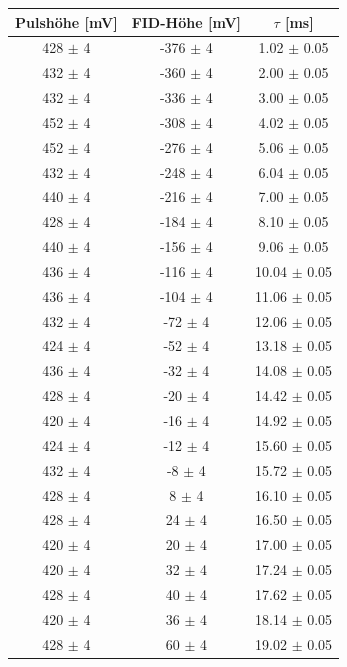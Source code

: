 \documentclass[12pt,a4paper]{article}
\begin{document}
\begin{table}
\centering
\begin{tabular}{|c|c|c|}
\hline 
Pulshöhe [mV] & FID-Höhe [mV] & $\tau$ [ms] \\ 
\hline 
428 $\pm$ 4 & -376 $\pm$ 4 & 1.02 $\pm$ 0.05 \\ 
\hline
432 $\pm$ 4 & -360 $\pm$ 4 & 2.00 $\pm$ 0.05 \\ 
\hline 
432 $\pm$ 4 & -336 $\pm$ 4 & 3.00 $\pm$ 0.05 \\ 
\hline 
452 $\pm$ 4 & -308 $\pm$ 4 & 4.02 $\pm$ 0.05 \\ 
\hline 
452 $\pm$ 4 & -276 $\pm$ 4 & 5.06 $\pm$ 0.05 \\ 
\hline
432 $\pm$ 4 & -248 $\pm$ 4 & 6.04 $\pm$ 0.05 \\ 
\hline 
440 $\pm$ 4 & -216 $\pm$ 4 & 7.00 $\pm$ 0.05 \\ 
\hline 
428 $\pm$ 4 & -184 $\pm$ 4 & 8.10 $\pm$ 0.05 \\ 
\hline 
440 $\pm$ 4 & -156 $\pm$ 4 & 9.06 $\pm$ 0.05 \\ 
\hline 
436 $\pm$ 4 & -116 $\pm$ 4 & 10.04 $\pm$ 0.05 \\ 
\hline
436 $\pm$ 4 & -104 $\pm$ 4 & 11.06 $\pm$ 0.05 \\ 
\hline 
432 $\pm$ 4 & -72 $\pm$ 4 & 12.06 $\pm$ 0.05 \\ 
\hline 
424 $\pm$ 4 & -52 $\pm$ 4 & 13.18 $\pm$ 0.05 \\ 
\hline 
436 $\pm$ 4 & -32 $\pm$ 4 & 14.08 $\pm$ 0.05 \\ 
\hline
428 $\pm$ 4 & -20 $\pm$ 4 & 14.42 $\pm$ 0.05 \\ 
\hline 
420 $\pm$ 4 & -16 $\pm$ 4 & 14.92 $\pm$ 0.05 \\ 
\hline 
424 $\pm$ 4 & -12 $\pm$ 4 & 15.60 $\pm$ 0.05 \\ 
\hline 
432 $\pm$ 4 & -8 $\pm$ 4 & 15.72 $\pm$ 0.05 \\ 
\hline 
428 $\pm$ 4 & 8 $\pm$ 4 & 16.10 $\pm$ 0.05 \\ 
\hline 
428 $\pm$ 4 & 24 $\pm$ 4 & 16.50 $\pm$ 0.05 \\ 
\hline 
420 $\pm$ 4 & 20 $\pm$ 4 & 17.00 $\pm$ 0.05 \\ 
\hline 
420 $\pm$ 4 & 32 $\pm$ 4 & 17.24 $\pm$ 0.05 \\ 
\hline 
428 $\pm$ 4 & 40 $\pm$ 4 & 17.62 $\pm$ 0.05 \\ 
\hline 
420 $\pm$ 4 & 36 $\pm$ 4 & 18.14 $\pm$ 0.05 \\ 
\hline 
428 $\pm$ 4 & 60 $\pm$ 4 & 19.02 $\pm$ 0.05 \\ 

\end{tabular}
\end{table}
\end{document}
